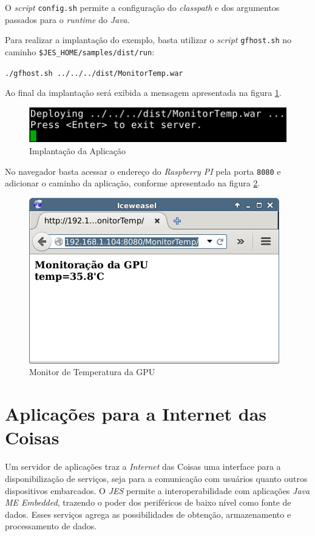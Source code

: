 O \textit{script} \verb|config.sh| permite a configuração do \textit{classpath}
e dos argumentos passados para o \textit{runtime} do \textit{Java}.

Para realizar a implantação do exemplo, basta utilizar o \textit{script}
\verb|gfhost.sh| no caminho \verb|$JES_HOME/samples/dist/run|:

\verb|./gfhost.sh ../../../dist/MonitorTemp.war|

Ao final da implantação será exibida a mensagem apresentada na figura
\ref{fig:java-me/java-jes-deploy}.

\begin{figure}[H]
    \centering
    \includegraphics[width=0.7\linewidth]{figuras/java/java-jes-deploy.png}
    \caption{Implantação da Aplicação}
    \label{fig:java-me/java-jes-deploy}
\end{figure}

No navegador basta acessar o endereço do \textit{Raspberry PI} pela porta
\verb|8080| e adicionar o caminho da aplicação, conforme apresentado na figura
\ref{fig:java-me/java-jes-browser}.

\begin{figure}[H]
    \centering
    \includegraphics[width=0.7\linewidth]{figuras/java/java-jes-browser.png}
    \caption{Monitor de Temperatura da GPU}
    \label{fig:java-me/java-jes-browser}
\end{figure}

\section{Aplicações para a Internet das Coisas}

Um servidor de aplicações traz a \textit{Internet} das Coisas uma interface
para a disponibilização de serviços, seja para a comunicação com usuários
quanto outros dispositivos embarcados. O \textit{JES} permite a
interoperabilidade com aplicações \textit{Java ME Embedded}, trazendo o poder
dos periféricos de baixo nível como fonte de dados. Esses serviços agrega as
possibilidades de obtenção, armazenamento e processamento de dados.

